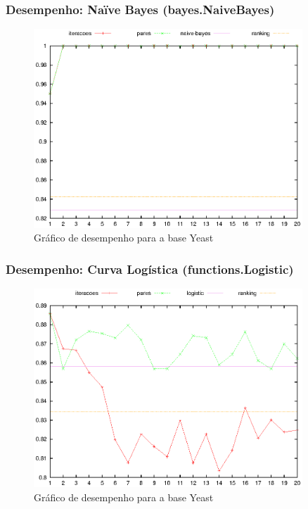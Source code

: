 \begin{frame}
    \frametitle{Desempenho: Naïve Bayes (bayes.NaiveBayes)}

    \begin{figure}[H]
        \centering
        \includegraphics[width=0.9\textwidth]{img/yeast_naive-bayes.eps}
        \caption{Gráfico de desempenho para a base Yeast}
    \end{figure}
\end{frame}

\begin{frame}
    \frametitle{Desempenho: Curva Logística (functions.Logistic)}

    \begin{figure}[H]
        \centering
        \includegraphics[width=0.9\textwidth]{img/yeast_logistic.eps}
        \caption{Gráfico de desempenho para a base Yeast}
    \end{figure}
\end{frame}

